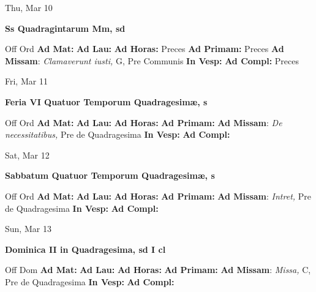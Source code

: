 \documentclass[10pt]{article}
\begin{document}
\begin{minipage}{3.5in}
\vspace{2em}\begin{center}
Thu, Mar 10
\end{center}\textbf{ \large Ss Quadragintarum Mm, \textnormal{\normalsize sd}}
\begin{justify}
Off Ord
\textbf{Ad Mat: }
\textbf{Ad Lau: }
\textbf{Ad Horas: }Preces
\textbf{Ad Primam: }Preces
\textbf{Ad Missam}: \textit{Clamaverunt iusti,} G, Pre Communis
\textbf{In Vesp: }
\textbf{Ad Compl: }Preces\end{justify}
\end{minipage}



\begin{minipage}{3.5in}
\vspace{2em}\begin{center}
Fri, Mar 11
\end{center}\textbf{ \large Feria VI Quatuor Temporum Quadragesimæ, \textnormal{\normalsize s}}
\begin{justify}
Off Ord
\textbf{Ad Mat: }
\textbf{Ad Lau: }
\textbf{Ad Horas: }
\textbf{Ad Primam: }
\textbf{Ad Missam}: \textit{De necessitatibus,} Pre de Quadragesima
\textbf{In Vesp: }
\textbf{Ad Compl: }\end{justify}
\end{minipage}



\begin{minipage}{3.5in}
\vspace{2em}\begin{center}
Sat, Mar 12
\end{center}\textbf{ \large Sabbatum Quatuor Temporum Quadragesimæ, \textnormal{\normalsize s}}
\begin{justify}
Off Ord
\textbf{Ad Mat: }
\textbf{Ad Lau: }
\textbf{Ad Horas: }
\textbf{Ad Primam: }
\textbf{Ad Missam}: \textit{Intret,} Pre de Quadragesima
\textbf{In Vesp: }
\textbf{Ad Compl: }\end{justify}
\end{minipage}



\begin{minipage}{3.5in}
\vspace{2em}\begin{center}
Sun, Mar 13
\end{center}\textbf{ \large Dominica II in Quadragesima, \textnormal{\normalsize sd I cl}}
\begin{justify}
Off Dom
\textbf{Ad Mat: }
\textbf{Ad Lau: }
\textbf{Ad Horas: }
\textbf{Ad Primam: }
\textbf{Ad Missam}: \textit{Missa,} C, Pre de Quadragesima
\textbf{In Vesp: }
\textbf{Ad Compl: }\end{justify}
\end{minipage}
\end{document}
